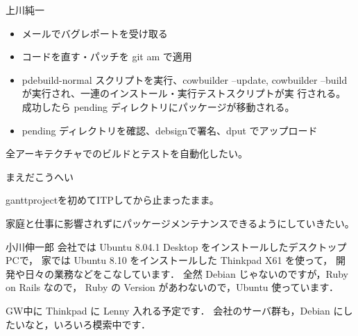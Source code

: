 
\begin{prework}{上川純一}

\begin{itemize}
 \item メールでバグレポートを受け取る
 \item コードを直す・パッチを git am で適用
 \item pdebuild-normal スクリプトを実行、cowbuilder --update, cowbuilder
       --build が実行され、一連のインストール・実行テストスクリプトが実
       行される。成功したら pending ディレクトリにパッケージが移動される。
 \item pending ディレクトリを確認、debsignで署名、dput でアップロード
\end{itemize}


全アーキテクチャでのビルドとテストを自動化したい。

\end{prework}

\begin{prework}{まえだこうへい}

ganttprojectを初めてITPしてから止まったまま。


家庭と仕事に影響されずにパッケージメンテナンスできるようにしていきたい。

\end{prework}



\begin{prework}{小川伸一郎}
会社では Ubuntu 8.04.1 Desktop をインストールしたデスクトップPCで，
家では Ubuntu 8.10 をインストールした Thinkpad X61 を使って，
開発や日々の業務などをこなしています．
全然 Debian じゃないのですが，Ruby on Rails なので，
Ruby の Version があわないので，Ubuntu 使っています．

GW中に Thinkpad に Lenny 入れる予定です．
会社のサーバ群も，Debian にしたいなと，いろいろ模索中です．

\end{prework}

